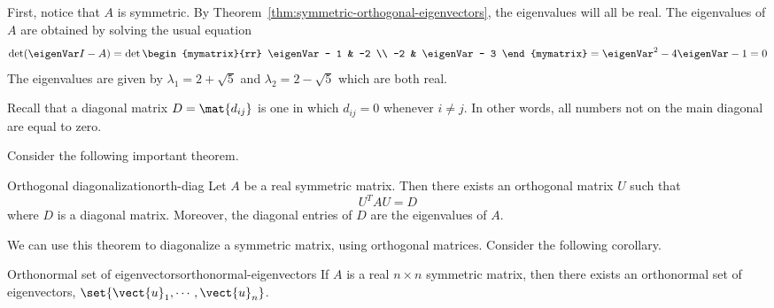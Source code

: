\begin{solution}
First, notice that $A$ is symmetric. By Theorem~\ref{thm:symmetric-orthogonal-eigenvectors}, the eigenvalues will all be real. The eigenvalues of $A$ are obtained by solving the usual equation 
\[
\det (\eigenVar I - A) = 
\det \begin{mymatrix}{rr}
\eigenVar - 1 & -2 \\ 
-2 & \eigenVar - 3 
\end{mymatrix} = \eigenVar^2 -4\eigenVar -1=0
\]
The eigenvalues are given by $\lambda_1 =2+
\sqrt{5}$ and $\lambda_2 =2-\sqrt{5}$ which are both real. 
\end{solution}

Recall that a diagonal matrix $D=\mat{d_{ij} }$ is one in which $d_{ij} = 0$ whenever $i \neq j$. In other words, all numbers not on the main diagonal are equal to zero. 

Consider the following important theorem.

\begin{theorem}{Orthogonal diagonalization}{orth-diag}
Let $A$ be a real symmetric matrix. Then there exists an
orthogonal matrix $U$ such that 
\[
U^{T}AU = D
\]
where $D$ is a diagonal matrix. Moreover,
the diagonal entries of $D$ are the eigenvalues of $A$.
\end{theorem}

We can use this theorem to diagonalize a symmetric matrix, using orthogonal matrices. Consider the following corollary.

\begin{corollary}{Orthonormal set of eigenvectors}{orthonormal-eigenvectors}
If $A$ is a real $n\times n$ symmetric matrix, then there exists an
orthonormal set of eigenvectors, $\set{\vect{u}_{1},\cdots ,\vect{u}
_{n}}$.
\end{corollary}

